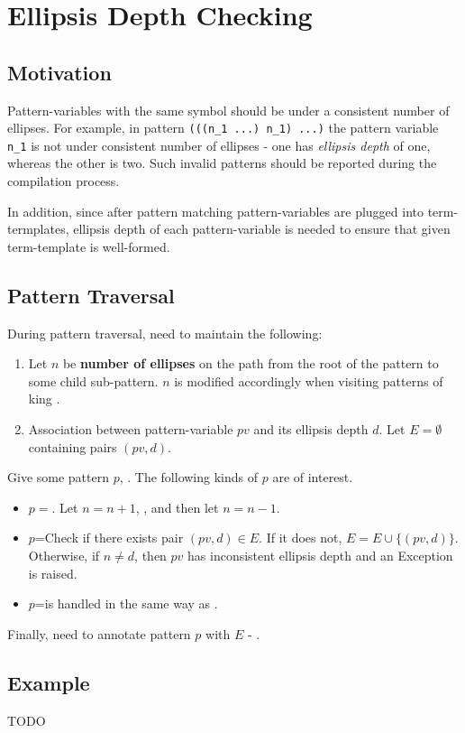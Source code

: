 \section{Ellipsis Depth Checking}

\subsection{Motivation}

Pattern-variables with the same symbol should be under a consistent number of ellipses. For example, in pattern \texttt{(((n\_1 ...) n\_1) ...)} the pattern variable \texttt{n\_1} is not under consistent number of ellipses - one has \textit{ellipsis depth} of one, whereas the other is two. Such invalid patterns should be reported during the compilation process.

In addition, since after pattern matching pattern-variables are plugged into term-termplates, ellipsis depth of each pattern-variable is needed to ensure that given term-template is well-formed.

\subsection{Pattern Traversal}

During pattern traversal, need to maintain the following:

\begin{enumerate}
\item
Let $n$ be \textbf{number of ellipses} on the path from the root of the pattern to some child sub-pattern. $n$ is modified accordingly when visiting patterns of king \RepeatNoArg.

\item Association between pattern-variable $pv$ and its ellipsis depth $d$. Let $E=\emptyset$ containing pairs $(pv, d)$. 
\end{enumerate}

Give some pattern $p$, . The following kinds of $p$ are of interest.
\begin{itemize}
\item $p=$\PatternRepeat. Let $n=n+1$, , and then let $n=n-1$.
\item $p$=\BuiltInPattern Check if there exists pair $(pv, d) \in E$. If it does not, $E = E \cup \{ (pv, d) \}$. Otherwise, if $n \neq d$, then $pv$ has inconsistent ellipsis depth and an Exception is raised.
\item $p$=\NonTerminal is handled in the same way as \BuiltInPatternNoArg.
\end{itemize}

Finally, need to annotate pattern $p$ with $E$ - .

\subsection{Example}

TODO
